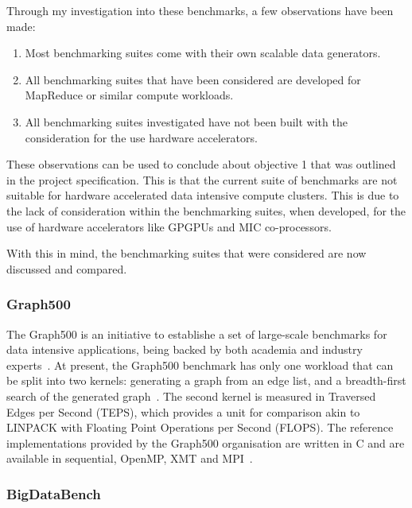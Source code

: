 \documentclass[12pt,a4paper]{article}
\begin{document}
            Through my investigation into these benchmarks, a few observations have been made:
            
            \begin{enumerate}
            \item Most benchmarking suites come with their own scalable data generators.
            \item All benchmarking suites that have been considered are developed for MapReduce or similar compute workloads.
            \item All benchmarking suites investigated have not been built with the consideration for the use hardware accelerators.
            \end{enumerate}
            
            These observations can be used to conclude about objective 1 that was outlined in the project specification. This is that the current suite of benchmarks are not suitable for hardware accelerated data intensive compute clusters. This is due to the lack of consideration within the benchmarking suites, when developed, for the use of hardware accelerators like GPGPUs and MIC co-processors.
            
            With this in mind, the benchmarking suites that were considered are now discussed and compared.
    
            \subsubsection{Graph500}
            \label{ssub:graph500}
            
                The Graph500 is an initiative to establishe a set of large-scale benchmarks for data intensive applications, being backed by both academia and industry experts~\cite{graph500-intro}. At present, the Graph500 benchmark has only one workload that can be split into two kernels: generating a graph from an edge list, and a breadth-first search of the generated graph~\cite{graph500-spec}. The second kernel is measured in Traversed Edges per Second (TEPS), which provides a unit for comparison akin to LINPACK with Floating Point Operations per Second (FLOPS). The reference implementations provided by the Graph500 organisation are written in C and are available in sequential, OpenMP, XMT and MPI~\cite{graph500-reference-impl}.
        
            \subsubsection{BigDataBench}
            \label{ssub:bigdatabench}
\end{document}
